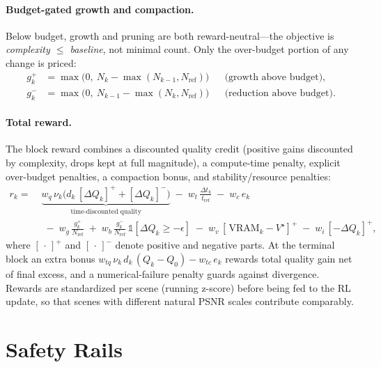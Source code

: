 \documentclass[11pt]{article}
\newcommand{\Nref}{N_{\mathrm{ref}}}
\newcommand{\Ndense}{N}
\begin{document}
\paragraph{Budget-gated growth and compaction.}
Below budget, growth and pruning are both reward-neutral---the objective is
\emph{complexity $\le$ baseline}, not minimal count. Only the over-budget portion
of any change is priced:
\begin{align}
g^{+}_k &= \max\!\big(0,\ \Ndense_k - \max(\Ndense_{k-1}, \Nref)\big)
          &&\text{(growth above budget)}, \\
g^{-}_k &= \max\!\big(0,\ \Ndense_{k-1} - \max(\Ndense_k, \Nref)\big)
          &&\text{(reduction above budget)}.
\end{align}

\paragraph{Total reward.}
The block reward combines a discounted quality credit (positive gains discounted
by complexity, drops kept at full magnitude), a compute-time penalty, explicit
over-budget penalties, a compaction bonus, and stability/resource penalties:
\begin{align}
r_k = \;& \underbrace{w_q\,\nu_k\big(d_k\,[\Delta Q_k]^{+} + [\Delta Q_k]^{-}\big)}_{\text{time-discounted quality}}
        \;-\; w_t\,\frac{\Delta t_k}{t_{\mathrm{ref}}}
        \;-\; w_c\,e_k \nonumber\\
      &\;-\; w_g\,\frac{g^{+}_k}{\Nref}
        \;+\; w_b\,\frac{g^{-}_k}{\Nref}\,\mathbb{1}[\Delta Q_k \ge -\epsilon]
        \;-\; w_v\,[\,\mathrm{VRAM}_k - V^{\star}]^{+}
        \;-\; w_i\,[-\Delta Q_k]^{+},
\end{align}
where $[\,\cdot\,]^{+}$ and $[\,\cdot\,]^{-}$ denote positive and negative parts.
At the terminal block an extra bonus
$w_{tq}\,\nu_k\,d_k\,(Q_k - Q_0) - w_{tc}\,e_k$ rewards total quality gain net of
final excess, and a numerical-failure penalty guards against divergence. Rewards
are standardized per scene (running z-score) before being fed to the RL update, so
that scenes with different natural PSNR scales contribute comparably.

\section{Safety Rails}
\label{sec:safety}
\end{document}
